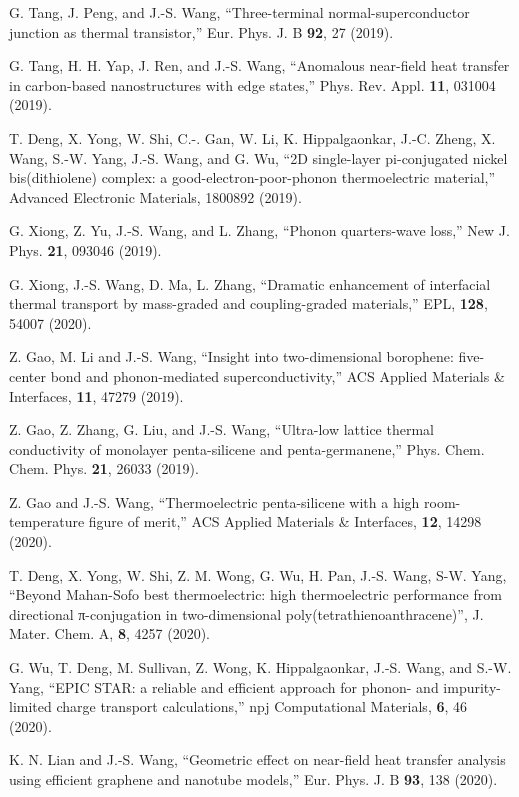 \itm G. Tang, J. Peng, and J.-S. Wang, 
``Three-terminal normal-superconductor junction as thermal transistor,'' 
Eur. Phys. J. B {\bf 92}, 27 (2019). 

\itm G. Tang, H. H. Yap, J. Ren, and J.-S. Wang,
 ``Anomalous near-field heat transfer in carbon-based nanostructures with edge states,'' 
 Phys. Rev. Appl. {\bf 11}, 031004 (2019). 

\itm T. Deng, X. Yong, W. Shi, C.-. Gan, W. Li, K. Hippalgaonkar, J.-C. Zheng, X. Wang, S.-W. Yang, J.-S. Wang, and G. Wu, 
``2D single-layer pi-conjugated nickel bis(dithiolene) complex: a good-electron-poor-phonon thermoelectric material,'' 
Advanced Electronic Materials, 1800892 (2019). 

\itm G. Xiong, Z. Yu, J.-S. Wang, and L. Zhang, ``Phonon quarters-wave loss,''
 New J. Phys. {\bf 21}, 093046 (2019). 

\itm G. Xiong, J.-S. Wang, D. Ma, L. Zhang, 
``Dramatic enhancement of interfacial thermal transport by mass-graded and coupling-graded materials,'' 
EPL, {\bf 128}, 54007 (2020). 

\itm Z. Gao, M. Li and J.-S. Wang, 
``Insight into two-dimensional borophene: five-center bond and phonon-mediated superconductivity,'' 
ACS Applied Materials \& Interfaces, {\bf 11}, 47279 (2019). 

\itm  Z. Gao, Z. Zhang, G. Liu, and J.-S. Wang, 
``Ultra-low lattice thermal conductivity of monolayer penta-silicene and penta-germanene,''
 Phys. Chem. Chem. Phys. {\bf 21}, 26033 (2019). 

\itm Z. Gao and J.-S. Wang, ``Thermoelectric penta-silicene with a high room-temperature figure of merit,''
 ACS Applied Materials \& Interfaces,  {\bf 12}, 14298 (2020). 

\itm T. Deng, X. Yong, W. Shi, Z. M. Wong, G. Wu, H. Pan, J.-S. Wang, S-W. Yang, 
``Beyond Mahan-Sofo best thermoelectric: high thermoelectric performance from directional π-conjugation 
in two-dimensional poly(tetrathienoanthracene)'', J. Mater. Chem. A, {\bf 8}, 4257 (2020). 

\itm G. Wu, T. Deng, M. Sullivan, Z. Wong, K. Hippalgaonkar, J.-S. Wang, and S.-W. Yang,
 ``EPIC STAR: a reliable and efficient approach for phonon- and impurity-limited charge transport calculations,''
  npj Computational Materials,  {\bf 6}, 46 (2020).  

\itm K. N. Lian and J.-S. Wang,
 ``Geometric effect on near-field heat transfer analysis using efficient graphene and nanotube models,''
  Eur. Phys. J. B {\bf 93}, 138 (2020).

